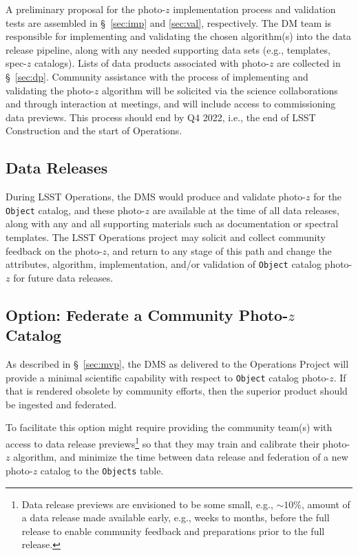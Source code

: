 \documentclass[DM,lsstdraft,toc]{lsstdoc}
\begin{document}
A preliminary proposal for the photo-$z$ implementation process and validation tests are assembled in \S~\ref{sec:imp} and \ref{sec:val}, respectively.
The DM team is responsible for implementing and validating the chosen algorithm(s) into the data release pipeline, along with any needed supporting data sets (e.g., templates, spec-$z$ catalogs).
Lists of data products associated with photo-$z$ are collected in \S~\ref{sec:dp}.
Community assistance with the process of implementing and validating the photo-$z$ algorithm will be solicited via the science collaborations and through interaction at meetings, and will include access to commissioning data previews.
This process should end by Q4 2022, i.e., the end of LSST Construction and the start of Operations.

\subsection{Data Releases}\label{ssec:time_dr}

During LSST Operations, the DMS would produce and validate photo-$z$ for the {\tt Object} catalog, and these photo-$z$ are available at the time of all data releases, along with any and all supporting materials such as documentation or spectral templates.
The LSST Operations project may solicit and collect community feedback on the photo-$z$, and return to any stage of this path and change the attributes, algorithm, implementation, and/or validation of {\tt Object} catalog photo-$z$ for future data releases.

\subsection{Option: Federate a Community Photo-$z$ Catalog}\label{ssec:time_opt}

As described in \S~\ref{sec:mvp}, the DMS as delivered to the Operations Project will provide a minimal scientific capability with respect to {\tt Object} catalog photo-$z$.
If that is rendered obsolete by community efforts, then the superior product should be ingested and federated.

To facilitate this option might require providing the community team(s) with access to data release previews\footnote{Data release previews are envisioned to be some small, e.g., $\sim10\%$, amount of a data release made available early, e.g., weeks to months, before the full release to enable community feedback and preparations prior to the full release.} so that they may train and calibrate their photo-$z$ algorithm, and minimize the time between data release and federation of a new photo-$z$ catalog to the {\tt Objects} table.
\end{document}
